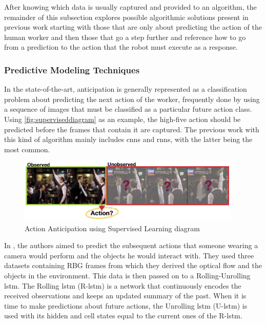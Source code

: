 
After knowing which data is usually captured and provided to an algorithm, the remainder of this subsection explores possible algorithmic solutions present in previous work starting with those that are only about predicting the action of the human worker and then those that go a step further and reference how to go from a prediction to the action that the robot must execute as a response.

\subsubsection{Predictive Modeling Techniques}

In the state-of-the-art, anticipation is generally represented as a classification problem about predicting the next action of the worker, frequently done by using a sequence of images that must be classified as a particular future action class. Using \autoref{fig:superviseddiagram} as an example, the high-five action should be predicted before the frames that contain it are captured. The previous work with this kind of algorithm mainly includes \acfp{cnn} and \acfp{rnn}, with the latter being the most common.

\begin{figure}[ht]
    \centering
    \includegraphics[width=0.95\textwidth]{figs/superviseddiagram.PNG}
    \caption[Action Anticipation using Supervised Learning diagram]{Action Anticipation using Supervised Learning diagram \cite{Gammulle2019}}
    \label{fig:superviseddiagram}
\end{figure}

In \textcite{Furnari2021}, the authors aimed to predict the subsequent actions that someone wearing a camera would perform and the objects he would interact with. They used three datasets containing RBG frames from which they derived the optical flow and the objects in the environment. This data is then passed on to a Rolling-Unrolling \acf{lstm}. The Rolling \acs{lstm} (R-\acs{lstm}) is a network that continuously encodes the received observations and keeps an updated summary of the past. When it is time to make predictions about future actions, the Unrolling \acs{lstm} (U-\acs{lstm}) is used with its hidden and cell states equal to the current ones of the R-\acs{lstm}.

